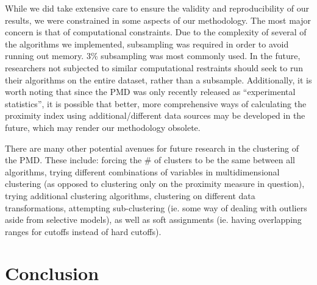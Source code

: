 \documentclass[11pt, a4paper]{article}
\begin{document}
\par
While we did take extensive care to ensure the validity and reproducibility of our results, we were constrained in some aspects of our methodology. The most major concern is that of computational constraints. Due to the complexity of several of the algorithms we implemented, subsampling was required in order to avoid running out memory. 3\% subsampling was most commonly used. In the future, researchers not subjected to similar computational restraints should seek to run their algorithms on the entire dataset, rather than a subsample. Additionally, it is worth noting that since the PMD was only recently released as ``experimental statistics'', it is possible that better, more comprehensive ways of calculating the proximity index using additional/different data sources may be developed in the future, which may render our methodology obsolete.
\par
There are many other potential avenues for future research in the clustering of the PMD. These include: forcing the \# of clusters to be the same between all algorithms, trying different combinations of variables in multidimensional clustering (as opposed to clustering only on the proximity measure in question), trying additional clustering algorithms, clustering on different data transformations, attempting sub-clustering (ie. some way of dealing with outliers aside from selective models), as well as soft assignments (ie. having overlapping ranges for cutoffs instead of hard cutoffs).









\pagebreak
\section{Conclusion}
\end{document}
